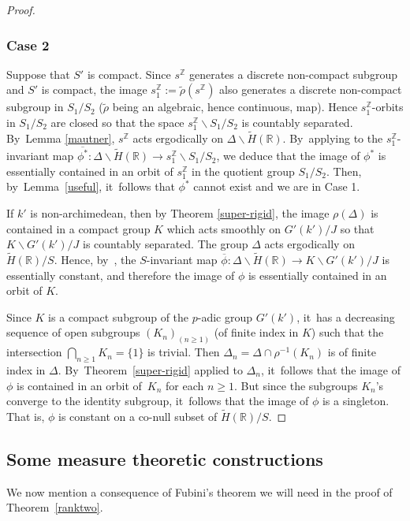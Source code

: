 \documentclass[10pt,a4paper]{amsart}
\theoremstyle{definition}
\newcommand{\field}[1]{\mathbb{#1}}
\newcommand{\R}{\field{R}}
\newcommand{\Z}{\field{Z}}
\let\bs\backslash
\begin{document}
\begin{proof}
\subsubsection*{Case 2}
Suppose that $S'$ is compact. Since $s^{\Z}$ generates a discrete
non-compact subgroup and $S'$ is compact, the image $s_1^{\Z}:= \tilde
\rho (s^{\Z})$ also generates a discrete non-compact subgroup in
$S_1/S_2$ ($\tilde \rho $ being an algebraic, hence continuous, map).
Hence $s_1^{\Z}$-orbits in $S_1/S_2$ are closed so that the space
$s_1^{\Z}\bs S_1/S_2$ is countably separated. By~Lemma \ref{mautner},
$s^{\Z}$ acts ergodically on $\Delta \bs \tilde H(\R)$. By~applying
\cite[Prop.\,(2.1.11)]{Z} to the $s_1^{\Z}$-invariant map
$\overline{\phi ^*}: \Delta \bs \tilde H(\R)\to s_1^{\Z}\bs S_1/S_2$,
we deduce that the image of $\phi ^*$ is essentially contained in an
orbit of $s_1^{\Z}$ in the quotient group $S_1/S_2$. Then, by~Lemma~\ref{useful}, it~follows that $\phi ^*$ cannot exist and we are in Case 1.

If $k'$ is non-archimedean, then by Theorem \ref{super-rigid}, the
image $\rho (\Delta)$ is contained in a compact group $K$ which acts
smoothly on $G'(k')/J$ so that $K\bs G'(k')/J$ is countably
separated. The group $\Delta $ acts ergodically on $\tilde H(\R)/S$.
Hence, by~\cite[Prop.\,(2.1.11)]{Z}, the $S$-invariant map
$\overline{\phi} :\Delta \bs \tilde {H}(\R) \to K\bs G'(k')/J$ is
essentially constant, and therefore the image of $\phi$ is essentially
contained in an orbit of $K$.

Since $K$ is a compact subgroup of the $p$-adic group $G'(k')$, it~has
a decreasing sequence of open subgroups $(K_n)_{(n\geq 1)}$ (of
finite index in $K$) such that the intersection $\bigcap_{n\geq 1}
K_n=\{1\}$ is trivial. Then $\Delta_n=\Delta \cap \rho ^{-1}(K_n)$
is of finite index in $\Delta$. By~Theorem~\ref{super-rigid} applied to
$\Delta_n$, it~follows that the image of $\phi $ is contained in an
orbit of~$K_n$ for each $n\geq 1$. But since the subgroups $K_n$'s
converge to the identity subgroup, it~follows that the image of $\phi
$ is a singleton. That is, $\phi $ is constant on a co-null subset of $\tilde{H}(\R)/S$.
\end{proof}

\subsection{Some measure theoretic constructions}

We now mention a consequence of Fubini's theorem we will need in the proof of Theorem~\ref{ranktwo}.
\end{document}
